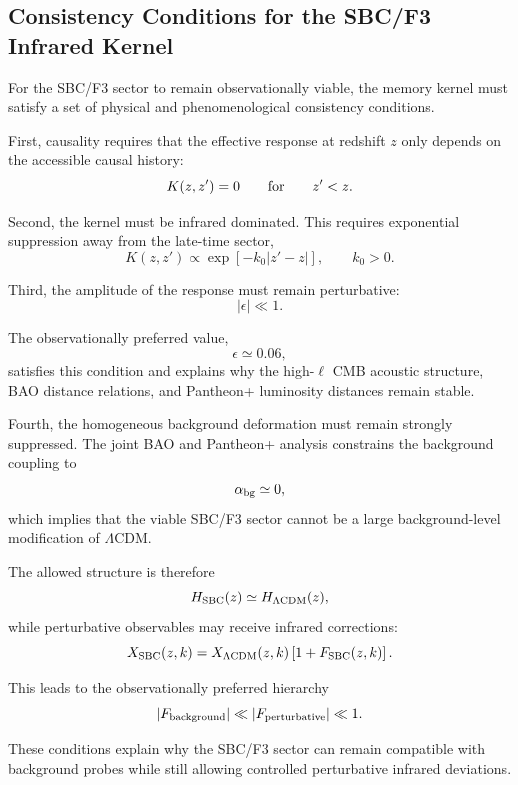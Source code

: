 \subsection{Consistency Conditions for the SBC/F3 Infrared Kernel}

For the SBC/F3 sector to remain observationally viable, the memory kernel must satisfy a set of physical and phenomenological consistency conditions.

First, causality requires that the effective response at redshift \(z\) only depends on the accessible causal history:
\begin{equation}
K(z,z')=0
\qquad
{\rm for}
\qquad
z'<z .
\end{equation}

Second, the kernel must be infrared dominated. This requires exponential suppression away from the late-time sector,
\begin{equation}
K(z,z') \propto \exp[-k_0 |z'-z|],
\qquad
k_0>0 .
\end{equation}

Third, the amplitude of the response must remain perturbative:
\begin{equation}
|\epsilon| \ll 1 .
\end{equation}

The observationally preferred value,
\begin{equation}
\epsilon\simeq 0.06,
\end{equation}
satisfies this condition and explains why the high-\(\ell\) CMB acoustic structure, BAO distance relations, and Pantheon+ luminosity distances remain stable.

Fourth, the homogeneous background deformation must remain strongly suppressed. The joint BAO and Pantheon+ analysis constrains the background coupling to
\begin{equation}
\alpha_{\rm bg}\simeq 0,
\end{equation}
which implies that the viable SBC/F3 sector cannot be a large background-level modification of \(\Lambda\)CDM.

The allowed structure is therefore
\begin{equation}
H_{\rm SBC}(z)\simeq H_{\Lambda{\rm CDM}}(z),
\end{equation}
while perturbative observables may receive infrared corrections:
\begin{equation}
X_{\rm SBC}(z,k)=X_{\Lambda{\rm CDM}}(z,k)
\left[1+F_{\rm SBC}(z,k)\right].
\end{equation}

This leads to the observationally preferred hierarchy
\begin{equation}
|F_{\rm background}|
\ll
|F_{\rm perturbative}|
\ll
1 .
\end{equation}

These conditions explain why the SBC/F3 sector can remain compatible with background probes while still allowing controlled perturbative infrared deviations.
